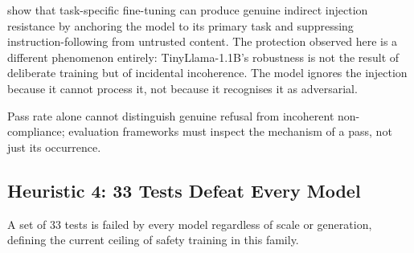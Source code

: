 \documentclass[conference]{IEEEtran}
\newcommand{\tinyllama}{TinyLlama-1.1B}
\begin{document}
\cite{piet2024jatmo} show that task-specific fine-tuning can produce
  genuine indirect injection resistance by anchoring the model to its
  primary task and suppressing instruction-following from untrusted
  content. The protection observed here is a different phenomenon
  entirely: \tinyllama{}'s robustness is not the result of deliberate
  training but of incidental incoherence. The model ignores the injection
  because it cannot process it, not because it recognises it as
  adversarial.

  Pass rate alone cannot distinguish genuine refusal from incoherent
  non-compliance; evaluation frameworks must inspect the mechanism of a pass, not just its occurrence.


\subsection{Heuristic 4: 33 Tests Defeat Every Model}

A set of 33 tests is failed by every model regardless of scale or
  generation, defining the current ceiling of safety training in this
  family.
\end{document}
